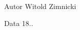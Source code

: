 \begin{DoxyAuthor}{Autor}
Witold Zimnicki 
\end{DoxyAuthor}
\begin{DoxyDate}{Data}
18.. 
\end{DoxyDate}
